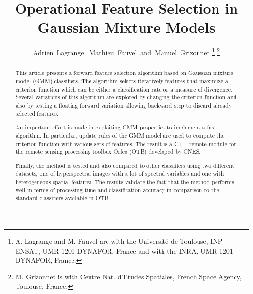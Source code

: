 \documentclass[journal,peerreview,onecolumn]{IEEEtran}
\begin{document}
%
\title{Operational Feature Selection in Gaussian Mixture Models}
%
%
%

\author{Adrien~Lagrange,~Mathieu~Fauvel~and~Manuel~Grizonnet%
\thanks{A. Lagrange and M. Fauvel are with the Université de Toulouse,
INP-ENSAT, UMR 1201 DYNAFOR, France and with the INRA, UMR 1201
DYNAFOR, France.}
\thanks{M. Grizonnet is with Centre Nat. d'Etudes Spatiales, French Space Agency, Toulouse, France.}}


\maketitle

\tableofcontents
\clearpage
\begin{abstract}
This article presents a forward feature selection algorithm based on Gaussian mixture model (GMM) classifiers. The algorithm selects iteratively features that maximize a criterion function which can be either a classification rate or a measure of divergence. Several variations of this algorithm are explored by changing the criterion function and also by testing a floating forward variation allowing backward step to discard already selected features.

An important effort is made in exploiting GMM properties to implement a fast algorithm. In particular, update rules of the GMM model are used to compute the criterion function with various sets of features. The result is a C++ remote module for the remote sensing processing toolbox Orfeo (OTB) developed by CNES.

Finally, the method is tested and also compared to other classifiers using two different datasets, one of hyperspectral images with a lot of spectral variables and one with heterogeneous spatial features. The results validate the fact that the method performs well in terms of processing time and classification accuracy in comparison to the standard classifiers available in OTB.\\
\end{abstract}
\end{document}
